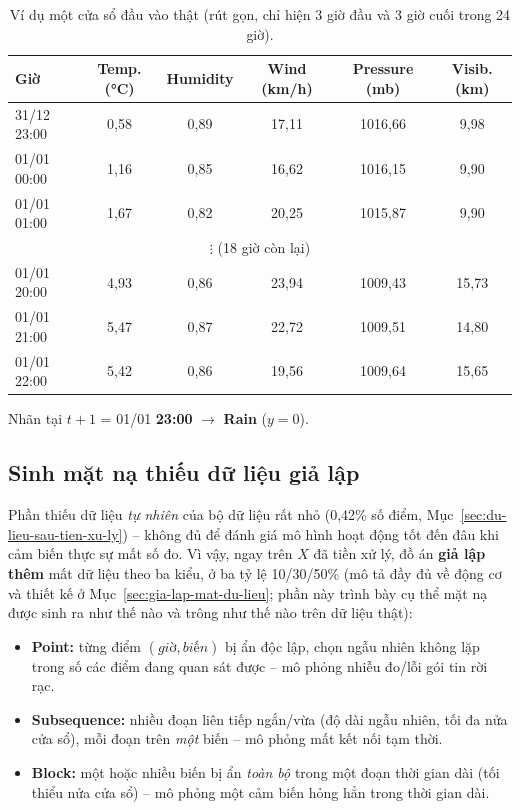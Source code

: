 \begin{table}[H]
\centering
\caption{Ví dụ một cửa sổ đầu vào thật (rút gọn, chỉ hiện 3 giờ đầu và 3 giờ cuối trong 24 giờ).}
\label{tab:vi-du-cua-so}
\small
\begin{tabular}{@{}lccccc@{}}
\toprule
Giờ & Temp. (°C) & Humidity & Wind (km/h) & Pressure (mb) & Visib. (km) \\
\midrule
31/12 23:00 & 0,58 & 0,89 & 17,11 & 1016,66 & 9,98 \\
01/01 00:00 & 1,16 & 0,85 & 16,62 & 1016,15 & 9,90 \\
01/01 01:00 & 1,67 & 0,82 & 20,25 & 1015,87 & 9,90 \\
\multicolumn{6}{c}{$\vdots$ (18 giờ còn lại)} \\
01/01 20:00 & 4,93 & 0,86 & 23,94 & 1009,43 & 15,73 \\
01/01 21:00 & 5,47 & 0,87 & 22,72 & 1009,51 & 14,80 \\
01/01 22:00 & 5,42 & 0,86 & 19,56 & 1009,64 & 15,65 \\
\bottomrule
\end{tabular}

\vspace{2pt}
\footnotesize Nhãn tại $t{+}1$ = 01/01 \textbf{23:00} $\to$ \textbf{Rain} ($y=0$).
\end{table}

\subsection{Sinh mặt nạ thiếu dữ liệu giả lập}
\label{sec:sinh-mat-na}

Phần thiếu dữ liệu \emph{tự nhiên} của bộ dữ liệu rất nhỏ (0,42\% số điểm,
Mục~\ref{sec:du-lieu-sau-tien-xu-ly}) -- không đủ để đánh giá mô hình hoạt động tốt đến
đâu khi cảm biến thực sự mất số đo. Vì vậy, ngay trên $X$ đã tiền xử lý, đồ án \textbf{giả
lập thêm} mất dữ liệu theo ba kiểu, ở ba tỷ lệ 10/30/50\% (mô tả đầy đủ về động cơ và thiết
kế ở Mục~\ref{sec:gia-lap-mat-du-lieu}; phần này trình bày cụ thể mặt nạ được sinh ra như
thế nào và trông như thế nào trên dữ liệu thật):

\begin{itemize}
  \item \textbf{Point:} từng điểm $(giờ, biến)$ bị ẩn độc lập, chọn ngẫu nhiên không lặp
        trong số các điểm đang quan sát được -- mô phỏng nhiễu đo/lỗi gói tin rời rạc.
  \item \textbf{Subsequence:} nhiều đoạn liên tiếp ngắn/vừa (độ dài ngẫu nhiên, tối đa nửa
        cửa sổ), mỗi đoạn trên \emph{một} biến -- mô phỏng mất kết nối tạm thời.
  \item \textbf{Block:} một hoặc nhiều biến bị ẩn \emph{toàn bộ} trong một đoạn thời gian
        dài (tối thiểu nửa cửa sổ) -- mô phỏng một cảm biến hỏng hẳn trong thời gian dài.
\end{itemize}

